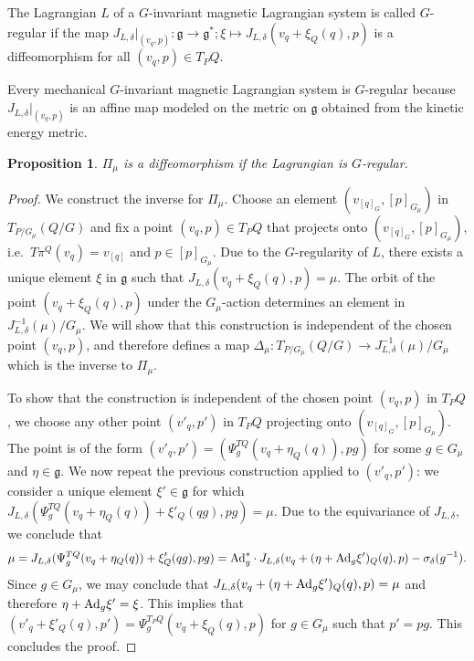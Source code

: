 \documentclass[11pt]{article}
\newtheorem{proposition}{Proposition}
\newcommand{\lag}{\mathfrak{g}}
\begin{document}
\begin{definition} The Lagrangian $L$ of a $G$-invariant magnetic Lagrangian system is called $G$-regular if the map $J_{L,\delta}|_{(v_q,p)}: \lag \to \lag^*; \xi \mapsto J_{L,\delta}(v_q +\xi_Q(q),p) $ is a dif\/feomorphism for all $(v_q,p)\in T_PQ$.
\end{definition}
Every mechanical $G$-invariant magnetic Lagrangian system is $G$-regular because $J_{L,\delta}|_{(v_q,p)}$ is an af\/f\/ine map modeled on the metric on $\lag$ obtained from the kinetic energy metric.

\begin{proposition}\label{prop:gregular} $\Pi_\mu$ is a diffeomorphism if the Lagrangian is $G$-regular.  \end{proposition}
\begin{proof}
We construct the inverse for $\Pi_\mu$. Choose an element $(v_{[q]_G},[p]_{G_\mu})$ in $T_{P/G_\mu}(Q/G)$ and f\/ix a point $(v_q,p)\in T_PQ$ that projects onto $(v_{[q]_G},[p]_{G_\mu})$, i.e.\ $T\pi^Q(v_q)=v_{[q]}$ and $p\in[p]_{G_\mu}$. Due to the $G$-regularity of $L$, there exists a unique element $\xi$ in $\lag$ such that $J_{L,\delta}(v_q +\xi_Q(q),p) = \mu$. The orbit of the point $(v_q+\xi_Q(q),p)$ under the $G_\mu$-action determines an element in $J_{L,\delta}^{-1}(\mu)/G_\mu$. We will show that this construction is independent of the chosen point $(v_q,p)$, and therefore def\/ines a map $\Delta_\mu: T_{P/G_\mu} (Q/G)\to J^{-1}_{L,\delta}(\mu)/G_\mu$ which is the inverse to $\Pi_\mu$.

To show that the construction is independent of the chosen point $(v_q,p)$ in $T_PQ$, we choose any other point $(v'_q,p')$ in $T_PQ$ projecting onto $(v_{[q]_G},[p]_{G_\mu})$. The point is of the form $(v'_q,p')=(\Psi^{TQ}_g(v_q+\eta_Q(q)),pg)$ for some $g\in G_\mu$ and $\eta\in\lag$. We now repeat the previous  construction applied to $(v'_q,p')$: we consider a unique element $\xi'\in\lag$ for which $J_{L,\delta}(\Psi^{TQ}_g(v_q+\eta_Q(q)) +\xi'_Q(qg),pg) = \mu$. Due to the equivariance of $J_{L,\delta}$, we conclude that
\begin{gather*}
\mu = J_{L,\delta}(\Psi^{TQ}_g(v_q+\eta_Q(q)) +\xi'_Q(qg),pg) ={\rm Ad}_g^*\cdot J_{L,\delta}(v_q+(\eta+{\rm Ad}_g\xi')_Q(q),p) -\sigma_\delta(g^{-1}).
 \end{gather*}
 Since $g\in G_\mu$, we may conclude that $J_{L,\delta}(v_q+(\eta+{\rm Ad}_g\xi')_Q(q),p)=\mu$ and therefore $\eta+{\rm Ad}_g\xi' = \xi$. This implies that $(v'_q+\xi'_Q(q),p')=\Psi^{T_PQ}_g(v_q+\xi_Q(q),p)$ for $g\in G_\mu$ such that $p'=pg$. This concludes the proof.
\end{proof}
\end{document}
